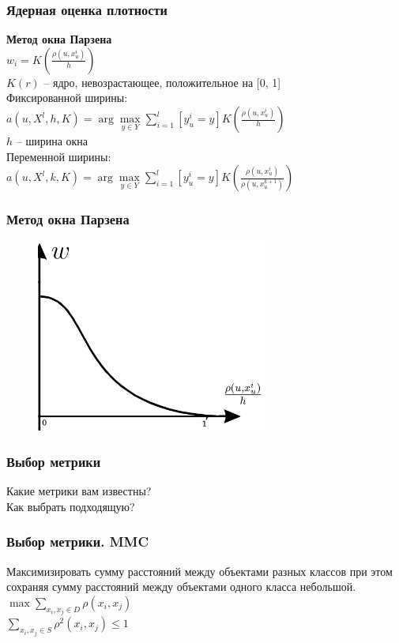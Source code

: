 \documentclass[12pt]{beamer}
\begin{document}
\begin{frame}\frametitle{Ядерная оценка плотности}
\textbf{Метод окна Парзена}\\
${w_i = K(\frac{\rho(u, x_u^i)}{h})}$\\
$K(r)$ -- ядро, невозрастающее, положительное на [0, 1]\\
\vspace{8mm} 
Фиксированной ширины:\\
${a(u, X^l, h, K) = \arg\max\limits_{y \in Y} \sum\limits_{i=1}^l [y_u^i = y] K(\frac{\rho(u, x_u^i)}{h})}$\\
$h$ -- ширина окна\\
\vspace{5mm}
Переменной ширины:\\
${a(u, X^l, k, K) = \arg\max\limits_{y \in Y} \sum\limits_{i=1}^l [y_u^i = y] K(\frac{\rho(u, x_u^i)}{\rho(u, x_u^{k+1})})}$

\end{frame}

\begin{frame}\frametitle{Метод окна Парзена}
\begin{figure}[htbp]
  \includegraphics[height=180pt, keepaspectratio = true]{parzen1}  
\end{figure}
\end{frame}

\begin{frame}\frametitle{Выбор метрики}
Какие метрики вам известны?\\
Как выбрать подходящую? 
\end{frame}

\begin{frame}\frametitle{Выбор метрики. MMC}
Максимизировать сумму расстояний между объектами разных классов
при этом сохраняя сумму расстояний между объектами одного класса небольшой.\\
\vspace{8mm}
${\max \sum\limits_{x_i, x_j \in D} \rho(x_i, x_j) }$\\
\vspace{8mm}
${\sum\limits_{x_i, x_j \in S} \rho^2(x_i, x_j) \leq 1 }$
\end{frame}
\end{document}
